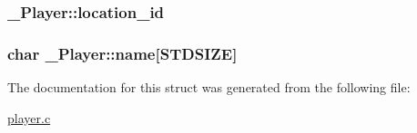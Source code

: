 \subsubsection[{\texorpdfstring{location\+\_\+id}{location_id}}]{ \+\_\+\+Player\+::location\+\_\+id}\hypertarget{struct__Player_aca2cb83e7a18dea36c33ad94e36a1e54}{}\label{struct__Player_aca2cb83e7a18dea36c33ad94e36a1e54}
\subsubsection[{\texorpdfstring{name}{name}}]{\setlength{\rightskip}{0pt plus 5cm}char \+\_\+\+Player\+::name\mbox{[}{\bf S\+T\+D\+S\+I\+ZE}\mbox{]}}\hypertarget{struct__Player_abd3fbad9568ff1e608654d58e71b8c58}{}\label{struct__Player_abd3fbad9568ff1e608654d58e71b8c58}


The documentation for this struct was generated from the following file\+:\begin{DoxyCompactItemize}
\item 
\hyperlink{player_8c}{player.\+c}\end{DoxyCompactItemize}
